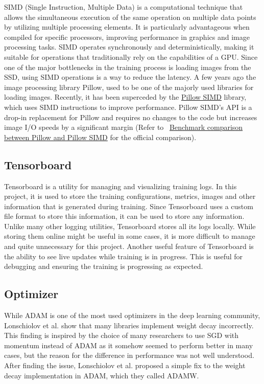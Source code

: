 \documentclass[a4paper,11pt,openright]{book}
\begin{document}
SIMD (Single Instruction, Multiple Data) is a computational technique that allows the simultaneous execution of the same operation on multiple data points by utilizing multiple processing elements. It is particularly advantageous when compiled for specific processors, improving performance in graphics and image processing tasks. SIMD operates synchronously and deterministically, making it suitable for operations that traditionally rely on the capabilities of a GPU. Since one of the major bottlenecks in the training process is loading images from the SSD, using SIMD operations is a way to reduce the latency. A few years ago the image processing library Pillow, used to be one of the majorly used libraries for loading images. Recently, it has been superceded by the \href{https://github.com/uploadcare/pillow-simd}{Pillow SIMD} library, which uses SIMD instructions to improve performance. Pillow SIMD's API is a drop-in replacement for Pillow and requires no changes to the code but increases image I/O speeds by a significant margin (Refer to ~\href{https://python-pillow.org/pillow-perf/}{Benchmark comparison between Pillow and Pillow SIMD} for the official comparison).

\subsection{Tensorboard}
Tensorboard is a utility for managing and visualizing training logs. In this project, it is used to store the training configurations, metrics, images and other information that is generated during training. Since Tensorboard uses a custom file format to store this information, it can be used to store any information. Unlike many other logging utilities, Tensorboard stores all its logs locally. While storing them online might be useful in some cases, it is more difficult to manage and quite unnecessary for this project.
Another useful feature of Tensorboard is the ability to see live updates while training is in progress. This is useful for debugging and ensuring the training is progressing as expected.

\subsection{Optimizer}
While ADAM \cite{kingmaAdamMethodStochastic2014} is one of the most used optimizers in the deep learning community, Lonschiolov et al. \cite{loshchilovDecoupledWeightDecay2019} show that many libraries implement weight decay incorrectly. This finding is inspired by the choice of many researchers to use SGD with momentum instead of ADAM as it somehow seemed to perform better in many cases, but the reason for the difference in performance was not well understood. After finding the issue, Lonschiolov et al. proposed a simple fix to the weight decay implementation in ADAM, which they called ADAMW.
\end{document}
